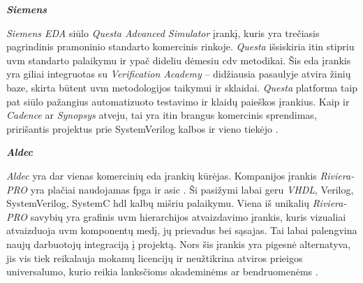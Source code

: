 \textbf{\textit{Siemens}}

\textit{Siemens EDA} siūlo \textit{Questa Advanced Simulator} įrankį, kuris yra trečiasis pagrindinis pramoninio standarto komercinis  rinkoje. \textit{Questa} išsiskiria itin stipriu \gls{uvm} standarto palaikymu ir ypač dideliu dėmesiu \gls{cdv} metodikai. Šis \gls{eda} įrankis yra giliai integruotas su \textit{Verification Academy} -- didžiausia pasaulyje atvira žinių baze, skirta būtent \gls{uvm} metodologijos taikymui ir sklaidai. \textit{Questa} platforma taip pat siūlo pažangius automatizuoto testavimo ir klaidų paieškos įrankius. Kaip ir \textit{Cadence} ar \textit{Synopsys} atveju, tai yra itin brangus komercinis sprendimas, pririšantis  projektus prie SystemVerilog kalbos ir vieno tiekėjo \cite{siemens}.

\textbf{\textit{Aldec}}

\textit{Aldec} yra dar vienas komercinių \gls{eda} įrankių kūrėjas. Kompanijos įrankis \textit{Riviera-PRO} yra plačiai naudojamas \gls{fpga} ir \gls{asic} . Ši  pasižymi labai geru \textit{VHDL}, Verilog, SystemVerilog, SystemC  \gls{hdl} kalbų mišriu palaikymu. Viena iš unikalių \textit{Riviera-PRO} savybių yra grafinis \gls{uvm} hierarchijos atvaizdavimo įrankis, kuris vizualiai atvaizduoja \gls{uvm} komponentų medį, jų prievadus bei sąsajas. Tai labai palengvina naujų darbuotojų integraciją į  projektą. Nors šis įrankis yra pigesnė alternatyva, jis vis tiek reikalauja mokamų licencijų ir neužtikrina atviros prieigos universalumo, kurio reikia lanksčioms akademinėms ar  bendruomenėms \cite{aldec}.

